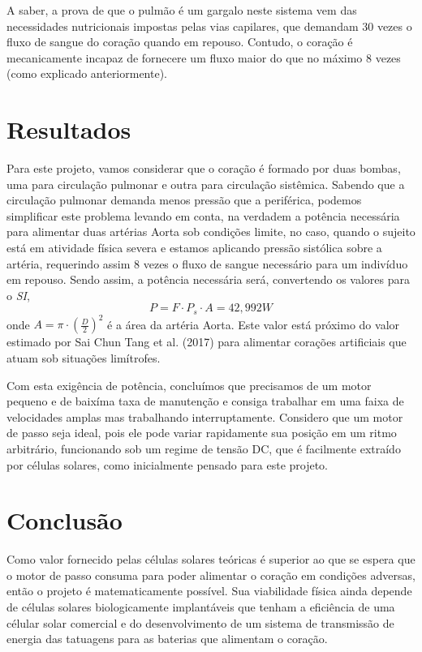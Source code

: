 \documentclass[12pt, a4paper, twoside]{article}
\begin{document}
A saber, a prova de que o pulmão é um gargalo neste sistema vem das necessidades nutricionais impostas pelas vias capilares, que demandam 30 vezes o fluxo de sangue do coração quando em repouso. Contudo, o coração é mecanicamente incapaz de fornecere um fluxo maior do que no máximo 8 vezes (como explicado anteriormente).

\section{Resultados}

Para este projeto, vamos considerar que o coração é formado por duas bombas, uma para circulação pulmonar e outra para circulação sistêmica. Sabendo que a circulação pulmonar demanda menos pressão que a periférica, podemos simplificar este problema levando em conta, na verdadem a potência necessária para alimentar duas artérias Aorta sob condições limite, no caso, quando o sujeito está em atividade física severa e estamos aplicando pressão sistólica sobre a artéria, requerindo assim 8 vezes o fluxo de sangue necessário para um indivíduo em repouso. Sendo assim, a potência necessária será, convertendo os valores para o \textit{SI},
$$ P = F \cdot P_s \cdot A = 42,992 W $$
onde $A = \pi \cdot\left(\frac{D}{2}\right)^2$ é a área da artéria Aorta. Este valor está próximo do valor estimado por Sai Chun Tang et al. (2017) para alimentar corações artificiais que atuam sob situações limítrofes.

Com esta exigência de potência, concluímos que precisamos de um motor pequeno e de baixíma taxa de manutenção e consiga trabalhar em uma faixa de velocidades amplas mas trabalhando interruptamente. Considero que um motor de passo seja ideal, pois ele pode variar rapidamente sua posição em um ritmo arbitrário, funcionando sob um regime de tensão DC, que é facilmente extraído por células solares, como inicialmente pensado para este projeto.

\section{Conclusão}

 Como valor fornecido pelas células solares teóricas é superior ao que se espera que o motor de passo consuma para poder alimentar o coração em condições adversas, então o projeto é matematicamente possível. Sua viabilidade física ainda depende de células solares biologicamente implantáveis que tenham a eficiência de uma célular solar comercial e do desenvolvimento de um sistema de transmissão de energia das tatuagens para as baterias que alimentam o coração.
\end{document}
